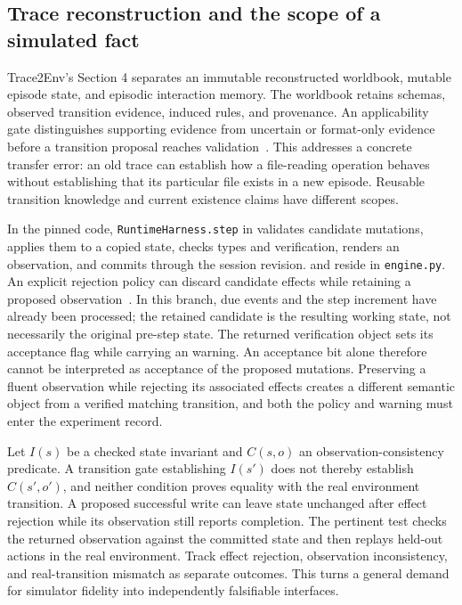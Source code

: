 \subsection{Trace reconstruction and the scope of a simulated fact}
\label{sec:C06:traceworld}
Trace2Env's Section 4 separates an immutable reconstructed worldbook, mutable episode state, and episodic interaction memory. The worldbook retains schemas, observed transition evidence, induced rules, and provenance. An applicability gate distinguishes supporting evidence from uncertain or format-only evidence before a transition proposal reaches validation~\cite{rewrite_trace2env2026}. This addresses a concrete transfer error: an old trace can establish how a file-reading operation behaves without establishing that its particular file exists in a new episode. Reusable transition knowledge and current existence claims have different scopes.

In the pinned code, \texttt{RuntimeHarness.step} in  validates candidate mutations, applies them to a copied state, checks types and verification, renders an observation, and commits through the session revision.  and  reside in \texttt{engine.py}. An explicit  rejection policy can discard candidate effects while retaining a proposed observation~\cite{rewrite_trace2env_repo}. In this branch, due events and the step increment have already been processed; the retained candidate is the resulting working state, not necessarily the original pre-step state. The returned verification object sets its acceptance flag while carrying an  warning. An acceptance bit alone therefore cannot be interpreted as acceptance of the proposed mutations. Preserving a fluent observation while rejecting its associated effects creates a different semantic object from a verified matching transition, and both the policy and warning must enter the experiment record.

Let $I(s)$ be a checked state invariant and $C(s,o)$ an observation-consistency predicate. A transition gate establishing $I(s')$ does not thereby establish $C(s',o')$, and neither condition proves equality with the real environment transition. A proposed successful write can leave state unchanged after effect rejection while its observation still reports completion. The pertinent test checks the returned observation against the committed state and then replays held-out actions in the real environment. Track effect rejection, observation inconsistency, and real-transition mismatch as separate outcomes. This turns a general demand for simulator fidelity into independently falsifiable interfaces.

